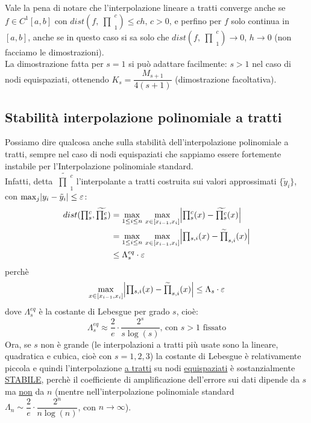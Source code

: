 \documentclass[12pt,a4paper]{article}
\DeclarePairedDelimiter{\abs}{\lvert}{\rvert}
\newcommand{\inter}{\begin{matrix}\prod\end{matrix}}
\begin{document}
\bigskip
Vale la pena di notare che l'interpolazione lineare a tratti converge anche se $f \in C^1[a,b]$ con $dist(f,\inter_1^c)\leq ch, \, c>0$, e perfino per $f$ solo continua in $[a,b]$, anche se in questo caso si sa solo che $dist(f,\inter_1^c) \rightarrow 0$, $h \rightarrow 0$ (non facciamo le dimostrazioni).\\
La dimostrazione fatta per $s=1$ si può adattare facilmente: $s>1$ nel caso di nodi equispaziati, ottenendo $K_s=\dfrac{M_{s+1}}{4(s+1)}$ (dimostrazione facoltativa).

\subsection{Stabilità interpolazione polinomiale a tratti}
Possiamo dire qualcosa anche sulla stabilità dell'interpolazione polinomiale a tratti, sempre nel caso di nodi equispaziati che sappiamo essere fortemente instabile per l'Interpolazione polinomiale standard.\\
Infatti, detta $\widetilde{\inter_1^c}$ l'interpolante a tratti costruita sui valori approssimati $\{\tilde{y}_i\}$, con $\max_j \abs{y_i-\tilde{y}_i}\leq \varepsilon$:
\[ \begin{split}
    dist(\inter_s^c,\widetilde{\inter_s^c}) & = \max_{1 \le i \le n}\, \max_{x \in [x_{i-1},x_i]} \abs*{\inter_s^c(x)-\widetilde{\inter_s^c}(x)} \\
    & = \max_{1 \le i \le n}\, \max_{x \in [x_{i-1},x_i]} \abs*{\inter_{s,i}(x)-\widetilde{\inter}_{s,i}(x)} \\
    & \leq \Lambda_s^{eq}\cdot \varepsilon
\end{split} \]
perchè
\[\max_{x \in [x_{i-1},x_i]}  \abs*{\inter_{s,i}(x)-\widetilde{\inter}_{s,i}(x)}\leq \Lambda_s \cdot \varepsilon\] 
dove $\Lambda_s^{eq}$ è la costante di Lebesgue per grado $s$, cioè:
\[ \Lambda_s^{eq} \approx \dfrac{2}{e} \cdot \dfrac{2^s}{s \log(s)} \text{, con } s>1 \text{ fissato} \]
Ora, se $s$ non è grande (le interpolazioni a tratti più usate sono la lineare, quadratica e cubica, cioè con $s=1,2,3$) la costante di Lebesgue è relativamente piccola e quindi l'interpolazione \uline{a tratti} su nodi \uline{equispaziati} è sostanzialmente \uline{STABILE}, perchè il coefficiente di amplificazione dell'errore sui dati dipende da $s$ ma \uline{non} da $n$ (mentre nell'interpolazione polinomiale standard $\Lambda_n \sim \dfrac{2}{e} \cdot \dfrac{2^n}{n \log(n)}$, con $n \to \infty$).\\


\end{document}
